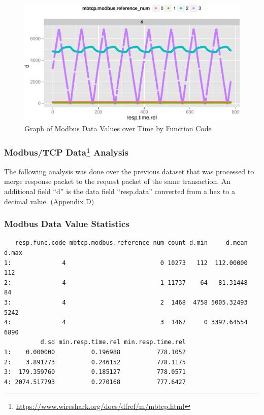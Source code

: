 \documentclass[11pt,]{article}
\let\rmarkdownfootnote\footnote%
\def\footnote{\protect\rmarkdownfootnote}
\begin{document}
\begin{figure}

{\centering \includegraphics{thesis_files/figure-latex/unnamed-chunk-29-1} 

}

\caption{Graph of Modbus Data Values over Time by Function Code}\label{fig:unnamed-chunk-29}
\end{figure}

\subsubsection[Modbus/TCP Data Analysis]{Modbus/TCP Data\footnote{\url{https://www.wireshark.org/docs/dfref/m/mbtcp.html}}
Analysis}\label{modbustcp-data3-analysis}

The following analysis was done over the previous dataset that was
processed to merge response packet to the request packet of the same
transaction. An additional field ``d'' is the data field ``resp.data''
converted from a hex to a decimal value. (Appendix D)

\subsubsection{Modbus Data Value
Statistics}\label{modbus-data-value-statistics}

\begin{verbatim}
   resp.func.code mbtcp.modbus.reference_num count d.min     d.mean d.max
1:              4                          0 10273   112  112.00000   112
2:              4                          1 11737    64   81.31448    84
3:              4                          2  1468  4758 5005.32493  5242
4:              4                          3  1467     0 3392.64554  6890
          d.sd min.resp.time.rel min.resp.time.rel
1:    0.000000          0.196988          778.1052
2:    3.891773          0.246152          778.1175
3:  179.359760          0.185127          778.0571
4: 2074.517793          0.270168          777.6427
\end{verbatim}
\end{document}
